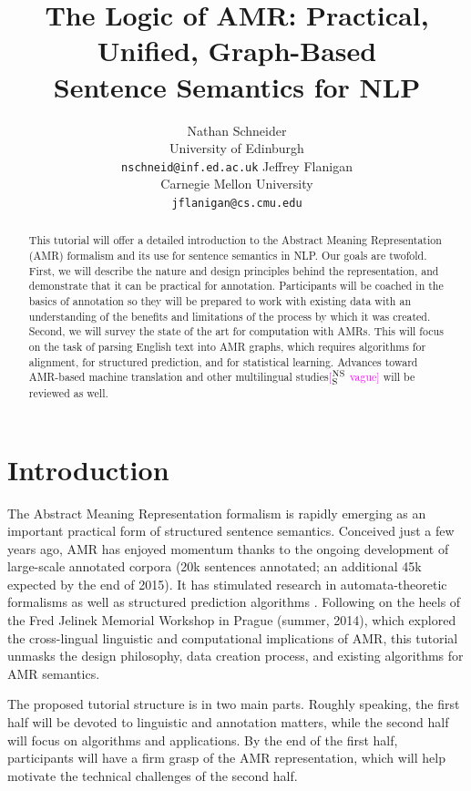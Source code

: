 \documentclass[11pt,letterpaper]{article}
\title{The Logic of AMR: Practical, Unified, Graph-Based\\ Sentence Semantics for NLP}
\author{Nathan Schneider\\
	University of Edinburgh\\
	{\tt nschneid@inf.ed.ac.uk}
\And
	Jeffrey Flanigan\\
	Carnegie Mellon University\\
	{\tt jflanigan@cs.cmu.edu}
	    }
\date{}
\newcommand{\ensuretext}[1]{#1}
\newcommand{\nssmarker}{\ensuretext{\textcolor{magenta}{\ensuremath{^{\textsc{NS}}_{\textsc{S}}}}}}
\newcommand{\arkcomment}[3]{\ensuretext{\textcolor{#3}{[#1 #2]}}}
\newcommand{\nss}[1]{\arkcomment{\nssmarker}{#1}{magenta}}
\begin{document}
\maketitle

\begin{abstract}
This tutorial will offer a detailed introduction to the Abstract Meaning Representation (AMR) formalism 
and its use for sentence semantics in NLP. Our goals are twofold. 
First, we will describe the nature and design principles behind the representation, 
and demonstrate that it can be practical for annotation. Participants will be coached in the basics of annotation 
so they will be prepared to work with existing data with an understanding of the benefits and limitations 
of the process by which it was created. 
Second, we will survey the state of the art for computation with AMRs. 
This will focus on the task of parsing English text into AMR graphs, which 
requires algorithms for alignment, for structured prediction, and for statistical learning. 
Advances toward AMR-based machine translation and other multilingual studies\nss{vague} will be reviewed as well.
\end{abstract}

\section{Introduction}

The Abstract Meaning Representation formalism \citep[AMR;][]{amr} 
is rapidly emerging as an important practical form of structured sentence semantics. 
Conceived just a few years ago, AMR has enjoyed momentum thanks to 
the ongoing development of large-scale annotated corpora 
(20k sentences annotated; an additional 45k expected by the end of 2015).
It has stimulated research in automata-theoretic formalisms \citep{jones-12,chiang-13}
as well as structured prediction algorithms \citep{flanigan-14}.
Following on the heels of the Fred Jelinek Memorial Workshop in Prague (summer, 2014), 
which explored the cross-lingual linguistic and computational implications of AMR, 
this tutorial unmasks the design philosophy, data creation process, and existing algorithms for 
AMR semantics.

The proposed tutorial structure is in two main parts. 
Roughly speaking, the first half will be devoted to linguistic and annotation matters, 
while the second half will focus on algorithms and applications.
By the end of the first half, participants will have a firm grasp of the AMR representation, 
which will help motivate the technical challenges of the second half.
\end{document}
